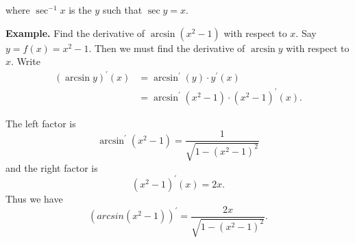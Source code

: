           where $\sec^{-1} x$ is the $y$ such that $\sec y = x$.

          \textbf{Example.} Find the derivative of $\arcsin(x^2 - 1)$ with respect to $x$. Say $y = f(x) = x^2 - 1$. Then we must find the derivative of $\arcsin y$ with respect to $x$. Write
          \begin{align*}
            (\arcsin y)^\prime(x) &= \arcsin^\prime(y) \cdot y^\prime(x)\\
            &= \arcsin^\prime(x^2 - 1) \cdot (x^2 - 1)^\prime(x).
          \end{align*}

          The left factor is
          \[\arcsin^\prime(x^2 - 1) = \frac{1}{\sqrt{1 - (x^2 - 1)^2}}\]
          and the right factor is
          \[(x^2 - 1)^\prime(x) = 2x.\]
          Thus we have
          \[(arcsin(x^2 - 1))^\prime = \frac{2x}{\sqrt{1 - (x^2 - 1)^2}}.\]

          
      
